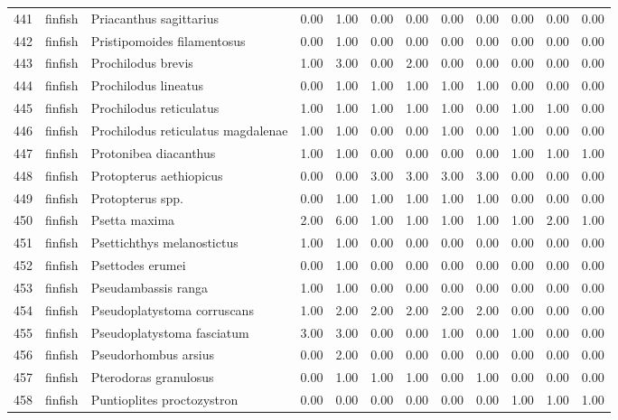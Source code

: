 \begin{table}[ht]
\begin{tabular}{rllrrrrrrrrr}
  441 & finfish & Priacanthus sagittarius & 0.00 & 1.00 & 0.00 & 0.00 & 0.00 & 0.00 & 0.00 & 0.00 & 0.00 \\ 
  442 & finfish & Pristipomoides filamentosus & 0.00 & 1.00 & 0.00 & 0.00 & 0.00 & 0.00 & 0.00 & 0.00 & 0.00 \\ 
  443 & finfish & Prochilodus brevis & 1.00 & 3.00 & 0.00 & 2.00 & 0.00 & 0.00 & 0.00 & 0.00 & 0.00 \\ 
  444 & finfish & Prochilodus lineatus & 0.00 & 1.00 & 1.00 & 1.00 & 1.00 & 1.00 & 0.00 & 0.00 & 0.00 \\ 
  445 & finfish & Prochilodus reticulatus & 1.00 & 1.00 & 1.00 & 1.00 & 1.00 & 0.00 & 1.00 & 1.00 & 0.00 \\ 
  446 & finfish & Prochilodus reticulatus magdalenae & 1.00 & 1.00 & 0.00 & 0.00 & 1.00 & 0.00 & 1.00 & 0.00 & 0.00 \\ 
  447 & finfish & Protonibea diacanthus & 1.00 & 1.00 & 0.00 & 0.00 & 0.00 & 0.00 & 1.00 & 1.00 & 1.00 \\ 
  448 & finfish & Protopterus aethiopicus & 0.00 & 0.00 & 3.00 & 3.00 & 3.00 & 3.00 & 0.00 & 0.00 & 0.00 \\ 
  449 & finfish & Protopterus spp. & 0.00 & 1.00 & 1.00 & 1.00 & 1.00 & 1.00 & 0.00 & 0.00 & 0.00 \\ 
  450 & finfish & Psetta maxima & 2.00 & 6.00 & 1.00 & 1.00 & 1.00 & 1.00 & 1.00 & 2.00 & 1.00 \\ 
  451 & finfish & Psettichthys melanostictus & 1.00 & 1.00 & 0.00 & 0.00 & 0.00 & 0.00 & 0.00 & 0.00 & 0.00 \\ 
  452 & finfish & Psettodes erumei & 0.00 & 1.00 & 0.00 & 0.00 & 0.00 & 0.00 & 0.00 & 0.00 & 0.00 \\ 
  453 & finfish & Pseudambassis ranga & 1.00 & 1.00 & 0.00 & 0.00 & 0.00 & 0.00 & 0.00 & 0.00 & 0.00 \\ 
  454 & finfish & Pseudoplatystoma corruscans & 1.00 & 2.00 & 2.00 & 2.00 & 2.00 & 2.00 & 0.00 & 0.00 & 0.00 \\ 
  455 & finfish & Pseudoplatystoma fasciatum & 3.00 & 3.00 & 0.00 & 0.00 & 1.00 & 0.00 & 1.00 & 0.00 & 0.00 \\ 
  456 & finfish & Pseudorhombus arsius & 0.00 & 2.00 & 0.00 & 0.00 & 0.00 & 0.00 & 0.00 & 0.00 & 0.00 \\ 
  457 & finfish & Pterodoras granulosus & 0.00 & 1.00 & 1.00 & 1.00 & 0.00 & 1.00 & 0.00 & 0.00 & 0.00 \\ 
  458 & finfish & Puntioplites proctozystron & 0.00 & 0.00 & 0.00 & 0.00 & 0.00 & 0.00 & 1.00 & 1.00 & 1.00 \\ 

\end{tabular}
\end{table}
